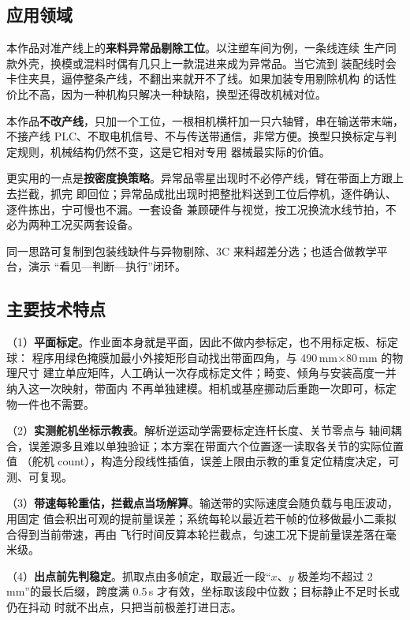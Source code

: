 \documentclass[UTF8,a4paper,zihao=5,fontset=windows]{ctexart}
\begin{document}
\subsection{应用领域}

本作品对准产线上的\textbf{来料异常品剔除工位}。以注塑车间为例，一条线连续
生产同款外壳，换模或混料时偶有几只上一款混进来成为异常品。当它流到
装配线时会卡住夹具，逼停整条产线，不翻出来就开不了线。如果加装专用剔除机构
的话性价比不高，因为一种机构只解决一种缺陷，换型还得改机械对位。

本作品\textbf{不改产线}，只加一个工位，一根相机横杆加一只六轴臂，串在输送带末端，不接产线
PLC、不取电机信号、不与传送带通信，非常方便。换型只换标定与判定规则，机械结构仍然不变，这是它相对专用
器械最实际的价值。

更实用的一点是\textbf{按密度换策略}。异常品零星出现时不必停产线，臂在带面上方跟上去拦截，抓完
即回位；异常品成批出现时把整批料送到工位后停机，逐件确认、逐件拣出，宁可慢也不漏。一套设备
兼顾硬件与视觉，按工况换流水线节拍，不必为两种工况买两套设备。

同一思路可复制到包装线缺件与异物剔除、3C 来料超差分选；也适合做教学平台，演示
“看见—判断—执行”闭环。

\subsection{主要技术特点}

（1）\textbf{平面标定}。作业面本身就是平面，因此不做内参标定，也不用标定板、标定球：
程序用绿色掩膜加最小外接矩形自动找出带面四角，与 490\,mm$\times$80\,mm 的物理尺寸
建立单应矩阵，人工确认一次存成标定文件；畸变、倾角与安装高度一并纳入这一次映射，带面内
不再单独建模。相机或基座挪动后重跑一次即可，标定物一件也不需要。

（2）\textbf{实测舵机坐标示教表}。解析逆运动学需要标定连杆长度、关节零点与
轴间耦合，误差源多且难以单独验证；本方案在带面六个位置逐一读取各关节的实际位置值
（舵机 count），构造分段线性插值，误差上限由示教的重复定位精度决定，可测、可复现。

（3）\textbf{带速每轮重估，拦截点当场解算}。输送带的实际速度会随负载与电压波动，用固定
值会积出可观的提前量误差；系统每轮以最近若干帧的位移做最小二乘拟合得到当前带速，再由
飞行时间反算本轮拦截点，匀速工况下提前量误差落在毫米级。

（4）\textbf{出点前先判稳定}。抓取点由多帧定，取最近一段“$x$、$y$ 极差均不超过
2\,mm”的最长后缀，跨度满 0.5\,s 才有效，坐标取该段中位数；目标静止不足时长或仍在抖动
时就不出点，只把当前极差打进日志。
\end{document}
